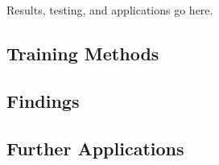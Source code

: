 Results, testing, and applications go here.

\subsection{Training Methods}

\subsection{Findings}

\subsection{Further Applications}